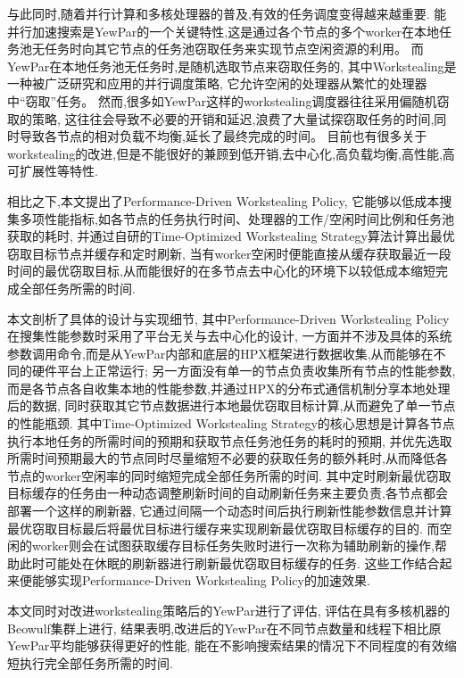 \documentclass{mproj}
\begin{document}
与此同时,随着并行计算和多核处理器的普及,有效的任务调度变得越来越重要.
能并行加速搜索是YewPar的一个关键特性,这是通过各个节点的多个worker在本地任务池无任务时向其它节点的任务池窃取任务来实现节点空闲资源的利用。
而YewPar在本地任务池无任务时,是随机选取节点来窃取任务的,
其中Workstealing是一种被广泛研究和应用的并行调度策略,
它允许空闲的处理器从繁忙的处理器中“窃取”任务。
然而,很多如YewPar这样的workstealing调度器往往采用偏随机窃取的策略,
这往往会导致不必要的开销和延迟,浪费了大量试探窃取任务的时间,同时导致各节点的相对负载不均衡,延长了最终完成的时间。
目前也有很多关于workstealing的改进,但是不能很好的兼顾到低开销,去中心化,高负载均衡,高性能,高可扩展性等特性.


相比之下,本文提出了Performance-Driven Workstealing Policy,
它能够以低成本搜集多项性能指标,如各节点的任务执行时间、处理器的工作/空闲时间比例和任务池获取的耗时,
并通过自研的Time-Optimized Workstealing Strategy算法计算出最优窃取目标节点并缓存和定时刷新,
当有worker空闲时便能直接从缓存获取最近一段时间的最优窃取目标,从而能很好的在多节点去中心化的环境下以较低成本缩短完成全部任务所需的时间.


本文剖析了具体的设计与实现细节,
其中Performance-Driven Workstealing Policy在搜集性能参数时采用了平台无关与去中心化的设计,
一方面并不涉及具体的系统参数调用命令,而是从YewPar内部和底层的HPX\cite{10.1145/2676870.2676883}框架进行数据收集,从而能够在不同的硬件平台上正常运行;
另一方面没有单一的节点负责收集所有节点的性能参数,而是各节点各自收集本地的性能参数,并通过HPX的分布式通信机制分享本地处理后的数据,
同时获取其它节点数据进行本地最优窃取目标计算,从而避免了单一节点的性能瓶颈.
其中Time-Optimized Workstealing Strategy的核心思想是计算各节点执行本地任务的所需时间的预期和获取节点任务池任务的耗时的预期,
并优先选取所需时间预期最大的节点同时尽量缩短不必要的获取任务的额外耗时,从而降低各节点的worker空闲率的同时缩短完成全部任务所需的时间.
其中定时刷新最优窃取目标缓存的任务由一种动态调整刷新时间的自动刷新任务来主要负责,各节点都会部署一个这样的刷新器,
它通过间隔一个动态时间后执行刷新性能参数信息并计算最优窃取目标最后将最优目标进行缓存来实现刷新最优窃取目标缓存的目的.
而空闲的worker则会在试图获取缓存目标任务失败时进行一次称为辅助刷新的操作,帮助此时可能处在休眠的刷新器进行刷新最优窃取目标缓存的任务.
这些工作结合起来便能够实现Performance-Driven Workstealing Policy的加速效果.


本文同时对改进workstealing策略后的YewPar进行了评估,
评估在具有多核机器的Beowulf集群上进行,
结果表明,改进后的YewPar在不同节点数量和线程下相比原YewPar平均能够获得更好的性能,
能在不影响搜索结果的情况下不同程度的有效缩短执行完全部任务所需的时间.
\end{document}
